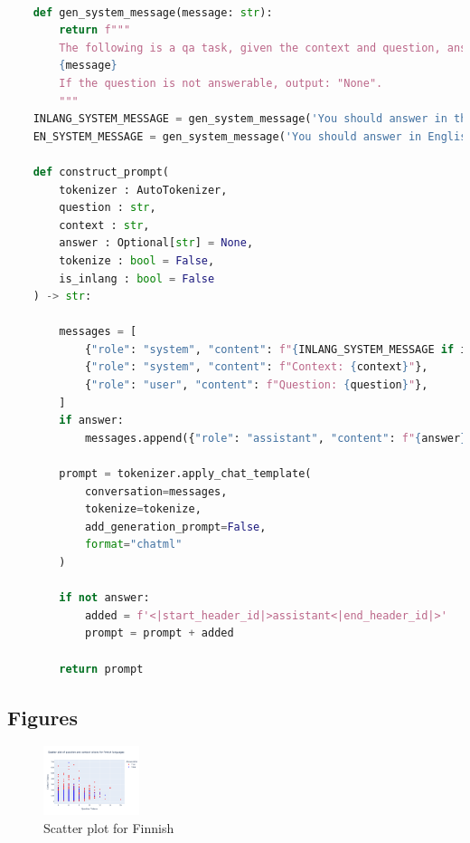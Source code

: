 \documentclass[11pt]{article}
\begin{document}
\begin{lstlisting}[language=Python]

    def gen_system_message(message: str):
        return f"""
        The following is a qa task, given the context and question, answer the question.The answer will be in the context.
        {message}
        If the question is not answerable, output: "None".
        """
    INLANG_SYSTEM_MESSAGE = gen_system_message('You should answer in the same language as the question.')
    EN_SYSTEM_MESSAGE = gen_system_message('You should answer in English.')
    
    def construct_prompt(
        tokenizer : AutoTokenizer,
        question : str,
        context : str,
        answer : Optional[str] = None,
        tokenize : bool = False,
        is_inlang : bool = False
    ) -> str:
        
        messages = [
            {"role": "system", "content": f"{INLANG_SYSTEM_MESSAGE if is_inlang else EN_SYSTEM_MESSAGE}"},
            {"role": "system", "content": f"Context: {context}"},
            {"role": "user", "content": f"Question: {question}"},
        ]
        if answer:
            messages.append({"role": "assistant", "content": f"{answer}"})
    
        prompt = tokenizer.apply_chat_template(
            conversation=messages, 
            tokenize=tokenize, 
            add_generation_prompt=False, 
            format="chatml"
        )
        
        if not answer:
            added = f'<|start_header_id|>assistant<|end_header_id|>'
            prompt = prompt + added
            
        return prompt
\end{lstlisting}

\subsection{Figures}
\label{sec:fig}
\begin{figure}[ht]
    \centering
    \includegraphics[width=0.25\textwidth]{week1_c_scatter_fi.png}
    \caption{Scatter plot for Finnish}
    \label{fig:scatter_week1_c_fi}
\end{figure}
\end{document}
